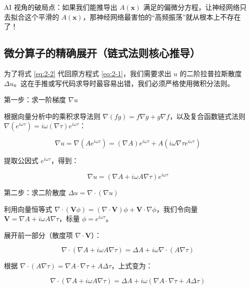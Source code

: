 \documentclass[12pt]{article}
\begin{document}
{AI 视角的破局点：如果我们能推导出 $A(\mathbf{x})$ 满足的偏微分方程，让神经网络只去拟合这个平滑的 $A(\mathbf{x})$，那神经网络最害怕的“高频振荡”就从根本上不存在了！

\subsection{微分算子的精确展开（链式法则核心推导）}

为了将式 \eqref{eq:2-2} 代回原方程式 \eqref{eq:2-1}，我们需要求出 $u$ 的二阶拉普拉斯散度 $\Delta u$。这在手推或写代码求导时最容易出错，我们必须严格使用微积分法则。

第一步：求一阶梯度 $\nabla u$

根据向量分析中的乘积求导法则 $\nabla(fg) = f\nabla g + g\nabla f$，以及复合函数链式法则 $\nabla(e^{i\omega \tau}) = i\omega (\nabla \tau) e^{i\omega \tau}$：

\begin{equation}
\nabla u = \nabla \left( A e^{i \omega \tau} \right) = (\nabla A) e^{i \omega \tau} + A \left( i \omega \nabla \tau e^{i \omega \tau} \right)
\label{eq:2-2-grad-expand}
\end{equation}

提取公因式 $e^{i \omega \tau}$，得到：

\begin{equation}
\nabla u = \left( \nabla A + i \omega A \nabla \tau \right) e^{i \omega \tau}
\label{eq:2-3}
\end{equation}

第二步：求二阶散度 $\Delta u = \nabla \cdot (\nabla u)$

利用向量恒等式 $\nabla \cdot (\mathbf{V} \phi) = (\nabla \cdot \mathbf{V})\phi + \mathbf{V} \cdot \nabla \phi$，我们令向量 $\mathbf{V} = \nabla A + i \omega A \nabla \tau$，标量 $\phi = e^{i \omega \tau}$。

展开前一部分（散度项 $\nabla \cdot \mathbf{V}$）：

\begin{equation}
\nabla \cdot (\nabla A + i \omega A \nabla \tau) = \Delta A + i \omega \nabla \cdot (A \nabla \tau)
\label{eq:2-div-v-1}
\end{equation}

根据 $\nabla \cdot (A \nabla \tau) = \nabla A \cdot \nabla \tau + A \Delta \tau$，上式变为：

\begin{equation}
\nabla \cdot (\nabla A + i \omega A \nabla \tau)
= \Delta A + i \omega (\nabla A \cdot \nabla \tau + A \Delta \tau)
\label{eq:2-div-v-2}
\end{equation}

}
\end{document}
